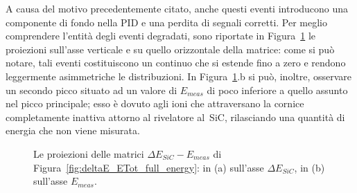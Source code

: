 A causa del motivo precedentemente citato, anche questi eventi introducono una componente di fondo nella PID e una perdita di segnali corretti.
Per meglio comprendere l'entità degli eventi degradati, sono riportate in Figura~\ref{fig:fetta} le proiezioni sull'asse verticale e su quello orizzontale della matrice: come si può notare, tali eventi costituiscono un continuo che si estende fino a zero e rendono leggermente asimmetriche le distribuzioni. 
In Figura~\ref{fig:fetta}.b si può, inoltre, osservare un secondo picco situato ad un valore di $E_{meas}$ di poco inferiore a quello assunto nel picco principale; esso è dovuto agli ioni che attraversano la cornice completamente inattiva attorno al rivelatore al~SiC, rilasciando una quantità di energia che non viene misurata.


\begin{figure} [!p]
	\centering
	
	\caption{Le proiezioni delle matrici $\Delta E_{SiC} - E_{meas}$ di Figura~\ref{fig:deltaE_ETot_full_energy}: in (a) sull'asse $\Delta E_{SiC}$, in (b) sull'asse $E_{meas}$.} \label{fig:fetta}
\end{figure}



